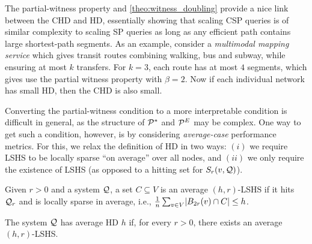 The partial-witness property and \cref{theo:witness_doubling} provide a nice link between the CHD and HD, essentially showing that scaling CSP queries is of similar complexity to scaling SP queries as long as any efficient path contains large shortest-path segments. As an example, consider a \emph{multimodal mapping service} which gives transit routes combining walking, bus and subway, while ensuring at most $k$ transfers. For $k=3$, each route has at most $4$ segments, which gives use the partial witness property with $\beta = 2$. Now if each individual network has small HD, then the CHD is also small.


Converting the partial-witness condition to a more interpretable condition is difficult in general, as the structure of $\mathcal{P}^*$ and $\mathcal{P}^E$ may be complex. One way to get such a condition, however, is by considering \emph{average-case} performance metrics.
For this, we relax the definition of HD in two ways: $(i)$ we require LSHS to be locally sparse ``on average'' over all nodes, and
$(ii)$ we only require the existence of LSHS (as opposed to a hitting set for $S_r(v,\mathcal{Q})$).

\begin{definition}
Given $r>0$ and a system $\mathcal{Q}$, a set $C\subseteq V$ is an average $(h,r)$-LSHS if it hits $\mathcal{Q}_r$ and is locally sparse in average, i.e.,
$\frac{1}{n}\sum_{v\in V} \lvert B_{2r}(v)\cap C\rvert \leq h$.
\end{definition}
\begin{definition}[Average HD]
The system $\mathcal{Q}$ has average HD $h$ if, for every $r>0$, there exists an average $(h,r)$-LSHS.
\end{definition}

